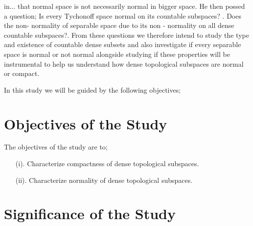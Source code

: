 \documentclass[PhD,14,a4paper]{report}
\theoremstyle{plain}
\theoremstyle{definition}
\theoremstyle{remark}
\numberwithin{figure}{section}
\numberwithin{equation}{subsection}
\begin{document}
{in... that normal space is not necessarily normal in bigger space. He then possed a question; Is every Tychonoff space normal on its countable subspaces? . Does the non- normality of separable space due to its non - normality on all dense countable subspaces?. From these questions we therefore intend to study the type and existence of countable dense subsets and also investigate if every separable space is  normal  or not normal alongside studying if these properties will be instrumental to help us understand how dense topological subspaces are normal or compact.

In this study we will be guided by the following objectives;
\section{Objectives of the Study}
The objectives of the study are to;
\begin{itemize}
  \item [(i).] Characterize  compactness of dense topological subspaces.
  \item [(ii).] Characterize  normality of dense topological subspaces.
\end{itemize}

\section{Significance of the Study}

}
\end{document}
